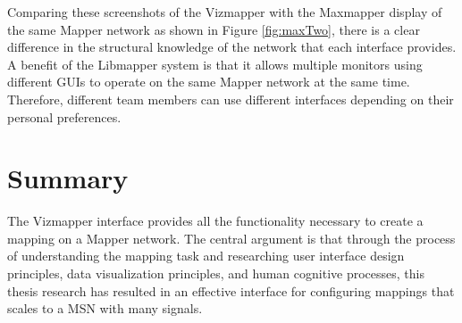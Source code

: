 Comparing these screenshots of the Vizmapper with the Maxmapper display of the same Mapper network as shown in Figure \ref{fig:maxTwo}, there is a clear difference in the structural knowledge of the network that each interface provides. A benefit of the Libmapper system is that it allows multiple monitors using different GUIs to operate on the same Mapper network at the same time. Therefore, different team members can use different interfaces depending on their personal preferences. 

\section{Summary}

The Vizmapper interface provides all the functionality necessary to create a mapping on a Mapper network. The central argument is that through the process of understanding the mapping task and researching user interface design principles, data visualization principles, and human cognitive processes, this thesis research has resulted in an effective interface for configuring mappings that scales to a MSN with many signals.
